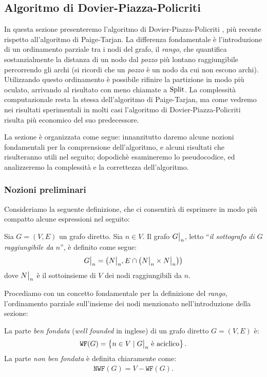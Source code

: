 \subsection{Algoritmo di Dovier-Piazza-Policriti}
\label{sec:dovier_piazza_policriti}
In questa sezione presenteremo l'algoritmo di Dovier-Piazza-Policriti \cite{dovier}, più recente rispetto all'algoritmo di Paige-Tarjan. La differenza fondamentale è l'introduzione di un ordinamento parziale tra i nodi del grafo, il \emph{rango}, che quantifica sostanzialmente la distanza di un nodo dal \emph{pozzo} più lontano raggiungibile percorrendo gli archi (si ricordi che un \emph{pozzo} è un nodo da cui non escono archi). Utilizzando questo ordinamento è possibile rifinire la partizione in modo più oculato, arrivando al risultato con meno chiamate a $\textup{Split}$. La complessità computazionale resta la stessa dell'algoritmo di Paige-Tarjan, ma come vedremo nei risultati sperimentali in molti casi l'algoritmo di Dovier-Piazza-Policriti risulta più economico del suo predecessore.

La sezione è organizzata come segue: innanzitutto daremo alcune nozioni fondamentali per la comprensione dell'algoritmo, e alcuni risultati che risulteranno utili nel seguito; dopodichè esamineremo lo pseudocodice, ed analizzeremo la complessità e la correttezza dell'algoritmo.

\subsubsection{Nozioni preliminari}
\label{sec:fba_preliminari}
Consideriamo la seguente definizione, che ci consentirà di esprimere in modo più compatto alcune espressioni nel seguito:
\begin{definition}
    \label{def:grafo_restr}
    Sia $G = (V,E)$ un grafo diretto. Sia $n \in V$. Il grafo $\restr{G}{n}$, letto ``\emph{il sottografo di $G$ raggiungibile da $n$}'', è definito come segue:
    \begin{gather*}
        \restr{G}{n} = \left(\restr{N}{n}, E \cap \left(\restr{N}{n} \times \restr{N}{n}\right)\right)
    \end{gather*}
    dove $\restr{N}{n}$ è il sottoinsieme di $V$ dei nodi raggiungibili da $n$.
\end{definition}

Procediamo con un concetto fondamentale per la definizione del \emph{rango}, l'ordinamento parziale sull'insieme dei nodi menzionato nell'introduzione della sezione:
\begin{definition}
    La parte \emph{ben fondata} (\emph{well founded} in inglese) di un grafo diretto $G = (V,E)$ è:
    \begin{gather*}
        \texttt{WF}(G) = \left\{n \in V \mid \restr{G}{n} \text{ è aciclico}\right\}.
    \end{gather*}
    La parte \emph{non ben fondata} è definita chiaramente come:
    \begin{gather*}
        \texttt{NWF}(G) = V - \texttt{WF}(G).
    \end{gather*}
\end{definition}

